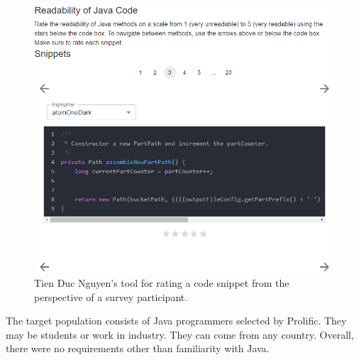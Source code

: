 \documentclass[%
class=scrreprt,
chapterprefix=false,%
open=right,%
twoside=false,%
paper=a4,%
logofile={Logo\_zentral\_farbig\_EN.png},%
thesistype=master,%
UKenglish,%
]{se2thesis}
\theoremstyle{definition}
\begin{document}
	\begin{figure}[tb]
		\centering
		\includegraphics[width=\textwidth]{img/survey_tool.png}
		\caption{Tien Duc Nguyen's tool for rating a code snippet from the perspective of a survey participant.}
		\label{fig:survey_tool}
	\end{figure}

	The target population consists of Java programmers selected by Prolific. They may be students or work in industry. They can come from any country. Overall, there were no requirements other than familiarity with Java.
	
	
\end{document}
